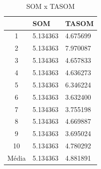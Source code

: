 \begin{table}[h]
\centering
\caption{SOM x TASOM}
\label{comp}
\begin{tabular}{c|l|l|}
\cline{2-3}
                            & SOM      & TASOM    \\ \hline
\multicolumn{1}{|c|}{1}     & 5.134363 & 4.675699 \\ \hline
\multicolumn{1}{|c|}{2}     & 5.134363 & 7.970087 \\ \hline
\multicolumn{1}{|c|}{3}     & 5.134363 & 4.657833 \\ \hline
\multicolumn{1}{|c|}{4}     & 5.134363 & 4.636273 \\ \hline
\multicolumn{1}{|c|}{5}     & 5.134363 & 6.346224 \\ \hline
\multicolumn{1}{|c|}{6}     & 5.134363 & 3.632400 \\ \hline
\multicolumn{1}{|c|}{7}     & 5.134363 & 3.755198 \\ \hline
\multicolumn{1}{|c|}{8}     & 5.134363 & 4.669887 \\ \hline
\multicolumn{1}{|c|}{9}     & 5.134363 & 3.695024 \\ \hline
\multicolumn{1}{|c|}{10}    & 5.134363 & 4.780292 \\ \hline
\multicolumn{1}{|l|}{Média} & 5.134363 & 4.881891 \\ \hline
\end{tabular}
\end{table}


























